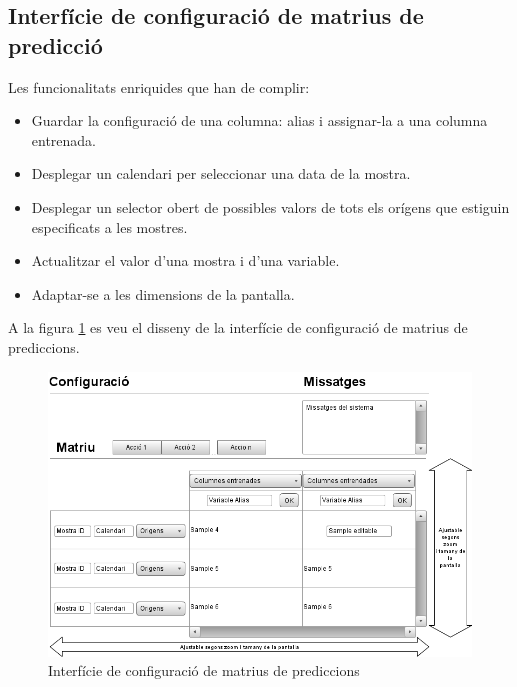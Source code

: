 \subsection{Interf\'{i}cie de configuraci\'{o} de matrius de predicció}
Les funcionalitats enriquides que han de complir:
\begin{itemize}
\item Guardar la configuració de una columna: alias i assignar-la a una columna entrenada.
\item Desplegar un calendari per seleccionar una data de la mostra.
\item Desplegar un selector obert de possibles valors de tots els orígens que estiguin especificats a les mostres.
\item Actualitzar el valor d'una mostra i d'una variable.
\item Adaptar-se a les dimensions de la pantalla.
\end{itemize}

A la figura \ref{fig:interfacematrixpredictionconf} es veu el disseny de la interfície de configuraci\'{o} de matrius de prediccions.

\begin{figure}[H]
  \includegraphics[scale=0.6]{img/design/Interficiedeconfiguraciopredi.png}
  \caption{Interfície de configuració de matrius de prediccions}
  \label{fig:interfacematrixpredictionconf}
\end{figure}
